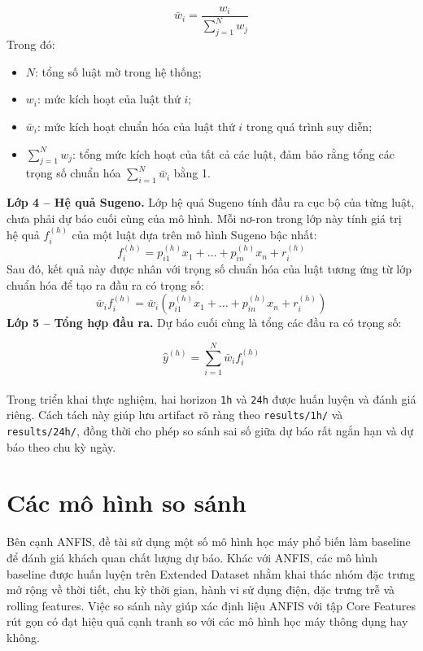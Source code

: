 \begin{equation}
  \bar{w}_i = \frac{w_i}{\sum_{j=1}^{N}w_j}
\end{equation}
Trong đó:
\begin{itemize}[leftmargin=1.2cm]
  \item $N$: tổng số luật mờ trong hệ thống;
  \item $w_i$: mức kích hoạt của luật thứ $i$;
  \item $\bar{w}_i$: mức kích hoạt chuẩn hóa của luật thứ $i$ trong quá trình suy diễn;
  \item $\sum_{j=1}^{N} w_j$: tổng mức kích hoạt của tất cả các luật, đảm bảo rằng tổng các trọng số chuẩn hóa $\sum_{i=1}^{N} \bar{w}_i$ bằng 1.
\end{itemize}
\textbf{Lớp 4 -- Hệ quả Sugeno.} Lớp hệ quả Sugeno tính đầu ra cục bộ của từng luật, chưa phải dự báo cuối cùng của mô hình. Mỗi nơ-ron trong lớp này tính giá trị hệ quả $f_i^{(h)}$ của một luật dựa trên mô hình Sugeno bậc nhất:
\begin{equation}
  f_i^{(h)} = p_{i1}^{(h)}x_1 + \ldots + p_{in}^{(h)}x_n + r_i^{(h)}
\end{equation}
Sau đó, kết quả này được nhân với trọng số chuẩn hóa của luật tương ứng từ lớp chuẩn hóa để tạo ra đầu ra có trọng số:
\begin{equation}
  \bar{w}_i f_i^{(h)} = \bar{w}_i(p_{i1}^{(h)}x_1 + \ldots + p_{in}^{(h)}x_n + r_i^{(h)})
\end{equation}
\textbf{Lớp 5 -- Tổng hợp đầu ra.} Dự báo cuối cùng là tổng các đầu ra có trọng số:

\begin{equation}
  \hat{y}^{(h)} = \sum_{i=1}^{N}\bar{w}_i f_i^{(h)}
\end{equation}
\\
Trong triển khai thực nghiệm, hai horizon \texttt{1h} và \texttt{24h} được huấn luyện và đánh giá riêng. Cách tách này giúp lưu artifact rõ ràng theo \texttt{results/1h/} và \texttt{results/24h/}, đồng thời cho phép so sánh sai số giữa dự báo rất ngắn hạn và dự báo theo chu kỳ ngày.

\section{Các mô hình so sánh}

Bên cạnh ANFIS, đề tài sử dụng một số mô hình học máy phổ biến làm baseline để đánh giá khách quan chất lượng dự báo. Khác với ANFIS, các mô hình baseline được huấn luyện trên Extended Dataset nhằm khai thác nhóm đặc trưng mở rộng về thời tiết, chu kỳ thời gian, hành vi sử dụng điện, đặc trưng trễ và rolling features. Việc so sánh này giúp xác định liệu ANFIS với tập Core Features rút gọn có đạt hiệu quả cạnh tranh so với các mô hình học máy thông dụng hay không.

